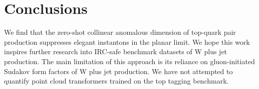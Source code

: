 \section{Conclusions}\label{sec:conclusions}

We find that the zero-shot collinear anomalous dimension of top-quark
pair production suppresses elegant instantons in the planar limit. We
hope this work inspires further research into IRC-safe benchmark
datasets of W plus jet production. The main limitation of this approach
is its reliance on gluon-initiated Sudakov form factors of W plus jet
production. We have not attempted to quantify point cloud transformers
trained on the top tagging benchmark.

